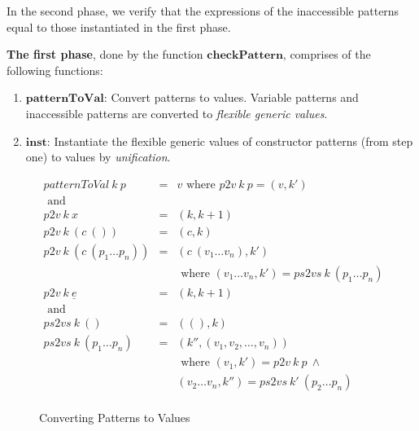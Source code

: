 \documentclass[acmsmall]{acmart}
\begin{document}
In the second phase, we verify that the expressions of the inaccessible patterns equal to those instantiated in the first phase.

\textbf{The first phase}, done by the function $\boldsymbol{checkPattern}$, comprises of the following functions:

\begin{enumerate}
  \item $\boldsymbol{patternToVal}$: Convert patterns to values. Variable patterns and inaccessible patterns are converted to \emph{flexible generic values}.
  \item $\boldsymbol{inst}$: Instantiate the flexible generic values of constructor patterns (from step one) to values by \emph{unification}.
\end{enumerate}

\begin{figure}[H]
  \begin{equation*}
    \begin{aligned}
      patternToVal \: k \: p             & = & v \textrm{ where } p2v \: k \: p = (v,k')                           \\
      \textrm{ and }                     &   &                                                                     \\
      p2v \: k \: x                      & = & (k,k+1)                                                             \\
      p2v \: k \: (c \: ())              & = & (c,k)                                                               \\
      p2v \: k \: (c \: (p_1 \dots p_n)) & = & (c \: (v_1 \dots v_n),k')                                           \\ 
                                         &   & \textrm{ where } (v_1 \dots v_n,k') = ps2vs \: k \: (p_1 \dots p_n) \\
      p2v \: k \: \underline{e}          & = & (k,k+1)                                                             \\
      \textrm{ and }                     &   &                                                                     \\
      ps2vs \: k \: ()                   & = & ((),k)                                                              \\
      ps2vs \: k \: (p_1 \dots p_n)      & = & (k'',(v_1,v_2,\dots,v_n))                                           \\
                                         &   & \textrm{ where } (v_1,k') = p2v \: k \: p \: \land                  \\
                                         &   & (v_2 \dots v_n,k'') = ps2vs \: k' \: (p_2 \dots p_n)                \\ 
    \end{aligned}
  \end{equation*}
  \caption{Converting Patterns to Values}
\end{figure}
\end{document}
